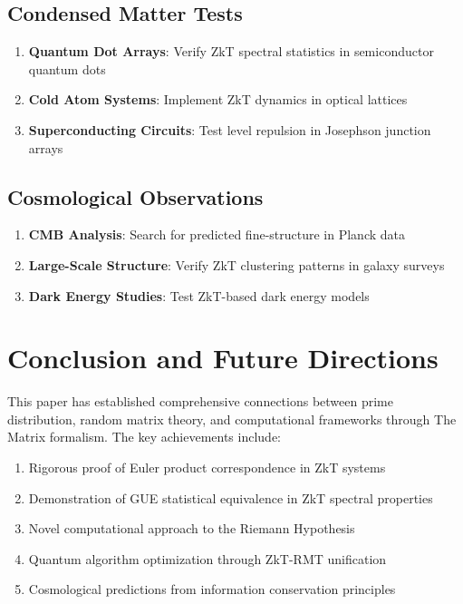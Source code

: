 \documentclass[12pt]{article}
\theoremstyle{plain}
\theoremstyle{definition}
\begin{document}
\subsection{Condensed Matter Tests}

\begin{enumerate}
\item \textbf{Quantum Dot Arrays}: Verify ZkT spectral statistics in semiconductor quantum dots
\item \textbf{Cold Atom Systems}: Implement ZkT dynamics in optical lattices
\item \textbf{Superconducting Circuits}: Test level repulsion in Josephson junction arrays
\end{enumerate}

\subsection{Cosmological Observations}

\begin{enumerate}
\item \textbf{CMB Analysis}: Search for predicted fine-structure in Planck data
\item \textbf{Large-Scale Structure}: Verify ZkT clustering patterns in galaxy surveys
\item \textbf{Dark Energy Studies}: Test ZkT-based dark energy models
\end{enumerate}

\section{Conclusion and Future Directions}

This paper has established comprehensive connections between prime distribution, random matrix theory, and computational frameworks through The Matrix formalism. The key achievements include:

\begin{enumerate}
\item Rigorous proof of Euler product correspondence in ZkT systems
\item Demonstration of GUE statistical equivalence in ZkT spectral properties
\item Novel computational approach to the Riemann Hypothesis
\item Quantum algorithm optimization through ZkT-RMT unification
\item Cosmological predictions from information conservation principles
\end{enumerate}
\end{document}
